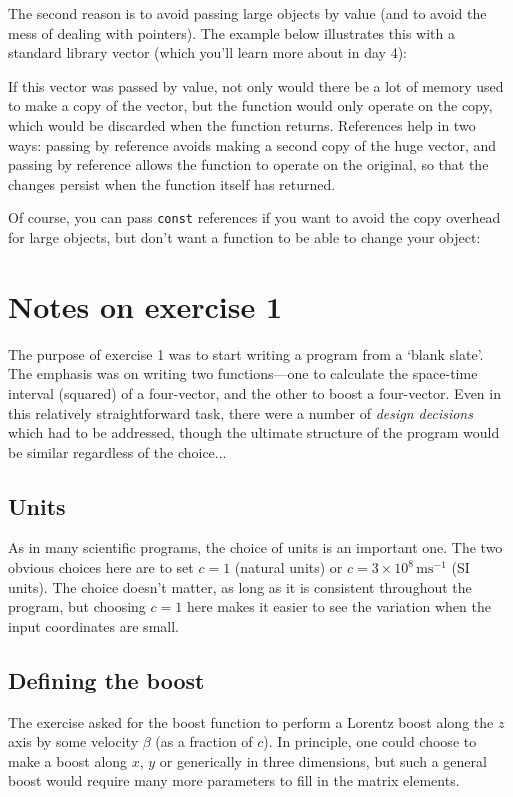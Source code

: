 \documentclass[a4paper]{scrartcl}
\begin{document}


The second reason is to avoid passing large objects by value (and to avoid the mess of dealing with pointers). The example below illustrates this with a standard library vector (which you'll learn more about in day 4):



If this vector was passed by value, not only would there be a lot of memory used to make a copy of the vector, but the function would only operate on the copy, which would be discarded when the function returns. References help in two ways: passing by reference avoids making a second copy of the huge vector, and passing by reference allows the function to operate on the original, so that the changes persist when the function itself has returned.

Of course, you can pass \verb|const| references if you want to avoid the copy overhead for large objects, but don't want a function to be able to change your object:



\section{Notes on exercise 1}
The purpose of exercise 1 was to start writing a program from a `blank slate'. The emphasis was on writing two functions---one to calculate the space-time interval (squared) of a four-vector, and the other to boost a four-vector. Even in this relatively straightforward task, there were a number of \emph{design decisions} which had to be addressed, though the ultimate structure of the program would be similar regardless of the choice...

\subsection{Units}
As in many scientific programs, the choice of units is an important one. The two obvious choices here are to set $c=1$ (natural units) or $c=3\times 10^8\,\mathrm{ms^{-1}}$ (SI units). The choice doesn't matter, as long as it is consistent throughout the program, but choosing $c=1$ here makes it easier to see the variation when the input coordinates are small.

\subsection{Defining the boost}
The exercise asked for the boost function to perform a Lorentz boost along the $z$ axis by some velocity $\beta$ (as a fraction of $c$). In principle, one could choose to make a boost along $x$, $y$ or generically in three dimensions, but such a general boost would require many more parameters to fill in the matrix elements.
\end{document}
